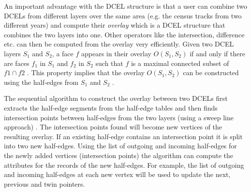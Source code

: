 An important advantage with the DCEL structure is that a user can combine two DCELs from different layers over the same area (e.g. the census tracks from two different years) and compute their \textit{overlay} which is a DCEL structure that combines the two layers into one. Other operators like the intersection, difference etc. can then be computed from the overlay very efficiently.
Given two DCEL layers $S_1$ and $S_2$, a face $f$ appears in their overlay  $O(S_1, S_2)$ if and only if there are faces $f_1$ in $S_1$ and $f_2$ in $S_2$ such that $f$ is a maximal connected subset of $f1 \cap f2$ \cite{berg_computational_2008}.  
This property implies that the overlay $O(S_1, S_2)$ can be constructed using the half-edges from $S_1$ and $S_2$ . 

The sequential algorithm to construct the overlay between two DCELs first extracts the half-edge segments from the half-edge tables and then finds intersection points between half-edges from the two layers (using a sweep line approach) \cite{berg_computational_2008}. 
The intersection points found will become new vertices of the resulting overlay. 
If an existing half-edge contains an intersection point it is split into two new half-edges. 
Using the list of outgoing and incoming half-edges for the newly added vertices (intersection points) the algorithm can compute the attributes for the records of the new half-edges. For example, the list of outgoing and incoming half-edges at each new vertex will be used to update the next, previous and twin pointers. 


